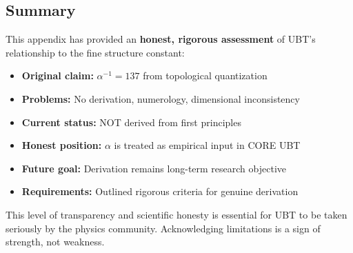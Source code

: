 \subsection{Summary}

This appendix has provided an \textbf{honest, rigorous assessment} of UBT's relationship to the fine structure constant:

\begin{itemize}
\item \textbf{Original claim:} $\alpha^{-1} = 137$ from topological quantization
\item \textbf{Problems:} No derivation, numerology, dimensional inconsistency
\item \textbf{Current status:} NOT derived from first principles
\item \textbf{Honest position:} $\alpha$ is treated as empirical input in CORE UBT
\item \textbf{Future goal:} Derivation remains long-term research objective
\item \textbf{Requirements:} Outlined rigorous criteria for genuine derivation
\end{itemize}

This level of transparency and scientific honesty is essential for UBT to be taken seriously by the physics community. Acknowledging limitations is a sign of strength, not weakness.
